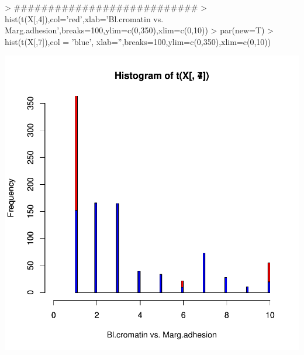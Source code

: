 \documentclass{article}
\begin{document}
\begin{Schunk}
\begin{Sinput}
> ###########################
> hist(t(X[,4]),col='red',xlab='Bl.cromatin vs. Marg.adhesion',breaks=100,ylim=c(0,350),xlim=c(0,10))
> par(new=T)
> hist(t(X[,7]),col = 'blue', xlab='',breaks=100,ylim=c(0,350),xlim=c(0,10))
\end{Sinput}
\end{Schunk}
\includegraphics{selecao-009}
\end{document}

